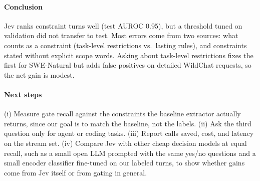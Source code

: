 \paragraph{Conclusion} Jev ranks constraint turns well (test AUROC 0.95),
but a threshold tuned on validation did not transfer to test. Most errors
come from two sources: what counts as a constraint (task-level restrictions
vs.\ lasting rules), and constraints stated without explicit scope words.
Asking about task-level restrictions fixes the first for SWE-Natural but adds
false positives on detailed WildChat requests, so the net gain is modest.

\paragraph{Next steps} (i) Measure gate recall against the constraints the
baseline extractor actually returns, since our goal is to match the
baseline, not the labels. (ii) Ask the third question only for agent or
coding tasks. (iii) Report calls saved, cost, and latency on the stream set.
(iv) Compare Jev with other cheap decision models at equal recall, such as a
small open LLM prompted with the same yes/no questions and a small encoder
classifier fine-tuned on our labeled turns, to show whether gains come from
Jev itself or from gating in general.
